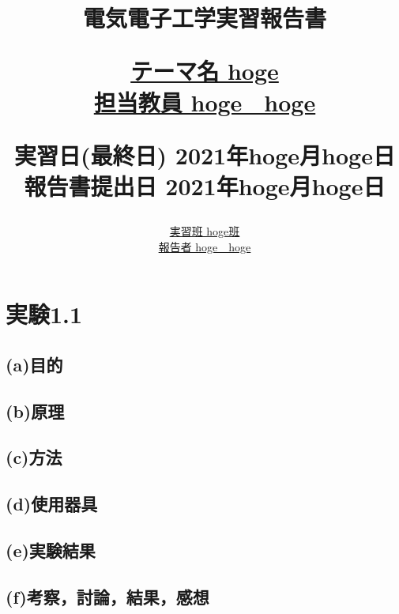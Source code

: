 \documentclass[10pt, a4paper, titlepage]{jarticle}
\title{
    \vspace{-5cm}
    \huge 電気電子工学実習報告書\\[10mm]
    \begin{flushleft}
    \Large
    \underline{テーマ名 hoge}\\[10mm]
    \underline{担当教員 hoge　hoge}\\[20mm]
    \end{flushleft}
    \Large
    実習日(最終日) 2021年hoge月hoge日\\[5mm]
    報告書提出日  2021年hoge月hoge日\\[5mm]
    }
\author{
    \underline{実習班 hoge班}\\[10mm]
    \underline{報告者 hoge　hoge}
    }
\date{}
\begin{document}
    \maketitle
    \section*{実験1.1}
    \subsection*{(a)目的}
    \subsection*{(b)原理}
    \subsection*{(c)方法}
    \subsection*{(d)使用器具}
    \subsection*{(e)実験結果}
    \subsection*{(f)考察，討論，結果，感想}
\end{document}
